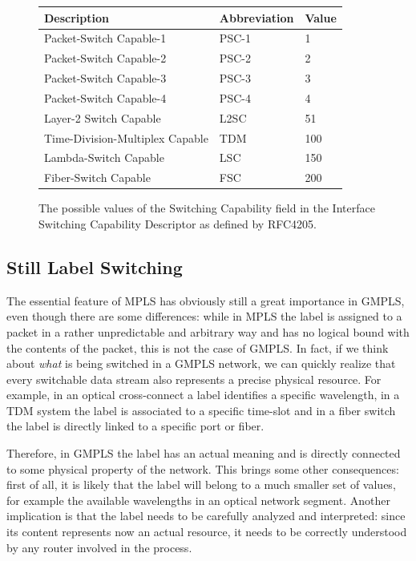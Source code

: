 \documentclass[10pt,a4paper]{report}
\begin{document}
\begin{figure}[!hbp]
  \begin{center}
    \begin{tabular}{|l|l|l|}
      \hline
      Description & Abbreviation & Value \\ \hline
      Packet-Switch Capable-1 & PSC-1 & 1 \\
      Packet-Switch Capable-2 & PSC-2 & 2 \\
      Packet-Switch Capable-3 & PSC-3 & 3 \\
      Packet-Switch Capable-4 & PSC-4 & 4 \\
      Layer-2 Switch Capable & L2SC & 51 \\
      Time-Division-Multiplex Capable & TDM & 100 \\
      Lambda-Switch Capable & LSC & 150 \\
      Fiber-Switch Capable & FSC & 200 \\
      \hline
    \end{tabular}
    \caption[Interface Switching Capability Descriptor]{The possible
      values of the Switching Capability field in the Interface
      Switching Capability Descriptor as defined by RFC4205.}
    \label{fig:gmpls_iscd}
  \end{center}
\end{figure}

\subsection{Still Label Switching}
The essential feature of MPLS has obviously still a great importance
in GMPLS, even though there are some differences: while in MPLS the
label is assigned to a packet in a rather unpredictable and arbitrary
way and has no logical bound with the contents of the packet, this is
not the case of GMPLS. In fact, if we think about \textit{what} is
being switched in a GMPLS network, we can quickly realize that every
switchable data stream also represents a precise physical
resource. For example, in an optical cross-connect a label identifies
a specific wavelength, in a TDM system the label is associated to a
specific time-slot and in a fiber switch the label is directly linked
to a specific port or fiber.  

Therefore, in GMPLS the label has an actual meaning and is directly
connected to some physical property of the network. This brings some
other consequences: first of all, it is likely that the label will
belong to a much smaller set of values, for example the available
wavelengths in an optical network segment. Another implication is that
the label needs to be carefully analyzed and interpreted: since its
content represents now an actual resource, it needs to be correctly
understood by any router involved in the process.
\end{document}

